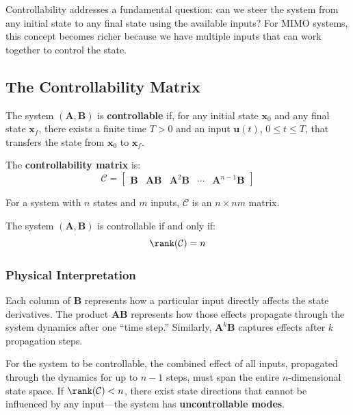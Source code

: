Controllability addresses a fundamental question: can we steer the system from any initial state to any final state using the available inputs? For MIMO systems, this concept becomes richer because we have multiple inputs that can work together to control the state.

\subsection{The Controllability Matrix}

\begin{definition}[Controllability]
The system $(\mathbf{A}, \mathbf{B})$ is \textbf{controllable} if, for any initial state $\mathbf{x}_0$ and any final state $\mathbf{x}_f$, there exists a finite time $T > 0$ and an input $\mathbf{u}(t)$, $0 \leq t \leq T$, that transfers the state from $\mathbf{x}_0$ to $\mathbf{x}_f$.
\end{definition}

The \textbf{controllability matrix} is:
\begin{equation}
\mathcal{C} = \begin{bmatrix} \mathbf{B} & \mathbf{A}\mathbf{B} & \mathbf{A}^2\mathbf{B} & \cdots & \mathbf{A}^{n-1}\mathbf{B} \end{bmatrix}
\label{eq:controllability_matrix}
\end{equation}

For a system with $n$ states and $m$ inputs, $\mathcal{C}$ is an $n \times nm$ matrix.

\begin{theorem}
The system $(\mathbf{A}, \mathbf{B})$ is controllable if and only if:
\begin{equation}
\rank(\mathcal{C}) = n
\end{equation}
\end{theorem}

\subsubsection{Physical Interpretation}

Each column of $\mathbf{B}$ represents how a particular input directly affects the state derivatives. The product $\mathbf{A}\mathbf{B}$ represents how those effects propagate through the system dynamics after one ``time step.'' Similarly, $\mathbf{A}^k\mathbf{B}$ captures effects after $k$ propagation steps.

For the system to be controllable, the combined effect of all inputs, propagated through the dynamics for up to $n-1$ steps, must span the entire $n$-dimensional state space. If $\rank(\mathcal{C}) < n$, there exist state directions that cannot be influenced by any input---the system has \textbf{uncontrollable modes}.

